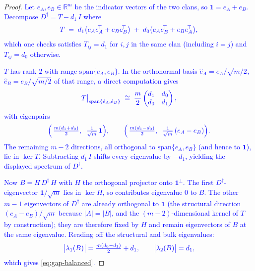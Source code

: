\documentclass[11pt]{article}
\newcommand{\new}[1]{\textcolor{blue}{#1}}
\newcommand{\newmath}[1]{{\color{blue} #1}}
\theoremstyle{remark}
\newcommand{\R}{\mathbb{R}}
\newcommand{\1}{\mathbf{1}}
\newcommand{\Ddist}{D^{\dagger}}      %
\newcommand{\Bop}{B}
\newcommand{\Hop}{H}                  %
\begin{document}
\begin{proof}
\new{Let $e_{A}, e_{B} \in \R^{m}$ be the indicator vectors of the two
clans, so $\1 = e_{A} + e_{B}$.  Decompose $\Ddist = T - d_{1}\,I$ where}
\begin{equation*}
\newmath{
  T \;=\; d_{1}\bigl(e_{A} e_{A}^{\!\top} + e_{B} e_{B}^{\!\top}\bigr)
       \;+\; d_{0}\bigl(e_{A} e_{B}^{\!\top} + e_{B} e_{A}^{\!\top}\bigr),
}
\end{equation*}
\new{which one checks satisfies $T_{ij} = d_{1}$ for $i, j$ in the same
clan (including $i = j$) and $T_{ij} = d_{0}$ otherwise.}

\new{$T$ has rank $2$ with range $\mathrm{span}\{e_{A}, e_{B}\}$. In the
orthonormal basis $\hat e_{A} = e_{A}/\sqrt{m/2}$, $\hat e_{B} =
e_{B}/\sqrt{m/2}$ of that range, a direct computation gives}
\begin{equation*}
\newmath{
  T\big|_{\mathrm{span}\{\hat e_{A},\hat e_{B}\}}
  \;\cong\; \frac{m}{2}\begin{pmatrix} d_{1} & d_{0} \\ d_{0} & d_{1} \end{pmatrix},
}
\end{equation*}
\new{with eigenpairs}
\begin{equation*}
\newmath{
  \Bigl(\,\tfrac{m(d_{1}+d_{0})}{2},\;\;\tfrac{1}{\sqrt{m}}\,\1\Bigr),
  \qquad
  \Bigl(\,\tfrac{m(d_{1}-d_{0})}{2},\;\;\tfrac{1}{\sqrt{m}}\,(e_{A}-e_{B})\Bigr).
}
\end{equation*}
\new{The remaining $m - 2$ directions, all orthogonal to
$\mathrm{span}\{e_{A}, e_{B}\}$ (and hence to $\1$), lie in $\ker T$.
Subtracting $d_{1}\,I$ shifts every eigenvalue by $-d_{1}$, yielding the
displayed spectrum of $\Ddist$.}

\new{Now $\Bop = \Hop\,\Ddist\,\Hop$ with $\Hop$ the orthogonal
projector onto $\1^{\perp}$.  The first $\Ddist$-eigenvector $\1/\sqrt
m$ lies in $\ker\Hop$, so contributes eigenvalue $0$ to $\Bop$.  The
other $m - 1$ eigenvectors of $\Ddist$ are already orthogonal to $\1$
(the structural direction $(e_{A}-e_{B})/\sqrt{m}$ because $|A| = |B|$,
and the $(m{-}2)$-dimensional kernel of $T$ by construction); they are
therefore fixed by $\Hop$ and remain eigenvectors of $\Bop$ at the same
eigenvalue.  Reading off the structural and bulk eigenvalues:}
\begin{equation*}
\newmath{
  \big|\lambda_{1}(\Bop)\big|
  = \tfrac{m(d_{0} - d_{1})}{2} + d_{1},
  \qquad
  \big|\lambda_{2}(\Bop)\big| = d_{1},
}
\end{equation*}
\new{which gives \eqref{eq:gap-balanced}.}
\end{proof}
\end{document}
